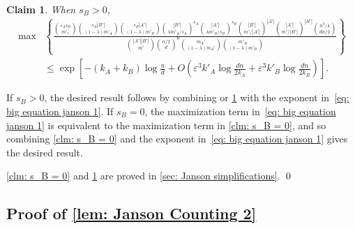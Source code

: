 \documentclass[11pt]{article}
\newcommand{\eps}{\varepsilon}
\theoremstyle{plain}
\newtheorem{claim}{Claim}[thm]
\begin{document}
\begin{claim}\label{clm: s_B > 0}
When $s_B > 0$,
    \begin{align*}
        \max&\left\{\frac{\binom{s_As_B}{m'_1}\binom{s_A|B'|}{(1 - \lambda )m'_A}\binom{s_B|A'|}{(1 - \lambda )m'_B}\binom{|B'|}{\lambda m'_A/s_A}^{s_A}\binom{|A'|}{\lambda m'_B/s_B}^{s_B}\binom{|B'|}{m'/|A'|}^{|A'|}\binom{|A'|}{m'/|B'|}^{|B'|}\binom{n^2/4}{dn/2}}                {\binom{|A'||B'|}{m'}\binom{n/2}{d}^{n}\binom{m_A'}{(1 - \lambda )m_A'}\binom{m'_B}{(1 - \lambda )m'_B}}\right\}\\ &\leq \exp\left[-(k_A + k_B)\log\frac{n}{d} +O\left(\eps^3k'_A\log\frac{dn}{2k_A} + \eps^3k'_B\log\frac{dn}{2k_B}\right)\right].
    \end{align*}
\end{claim}

If $s_B > 0$, the desired result follows by combining or \cref{clm: s_B > 0} with the exponent in~\eqref{eq: big equation janson 1}.
If $s_B = 0$, the maximization term in~\eqref{eq: big equation janson 1} is equivalent to the maximization term in \cref{clm: s_B = 0}, and so combining \cref{clm: s_B = 0} and the exponent in~\eqref{eq: big equation janson 1} gives the desired result.

\cref{clm: s_B = 0} and \cref{clm: s_B > 0} are proved in \cref{sec: Janson simplifications}.
\qed


 
\subsection{Proof of \cref{lem: Janson Counting 2}}\label{sec: Janson counting 2}
\end{document}
